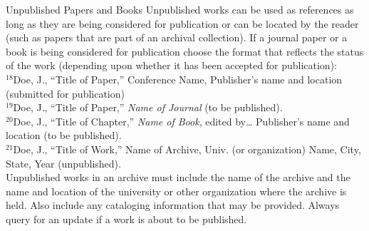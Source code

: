 Unpublished Papers and Books
Unpublished works can be used as references as long as they are being considered for publication or can be located by the reader (such as papers that are part of an archival collection). If a journal paper or a book is being considered for publication choose the format that reflects the status of the work (depending upon whether it has been accepted for publication): \\

$^{18}$Doe, J., “Title of Paper,” Conference Name, Publisher’s name and location (submitted for publication) \\
$^{19}$Doe, J., “Title of Paper,” \textit{Name of Journal} (to be published). \\
$^{20}$Doe, J., “Title of Chapter,” \textit{Name of Book}, edited by… Publisher’s name and location (to be published). \\
$^{21}$Doe, J., “Title of Work,” Name of Archive, Univ. (or organization) Name, City, State, Year (unpublished). \\

Unpublished works in an archive must include the name of the archive and the name and location of the university or other organization where the archive is held. Also include any cataloging information that may be provided. Always query for an update if a work is about to be published.

\pagebreak
